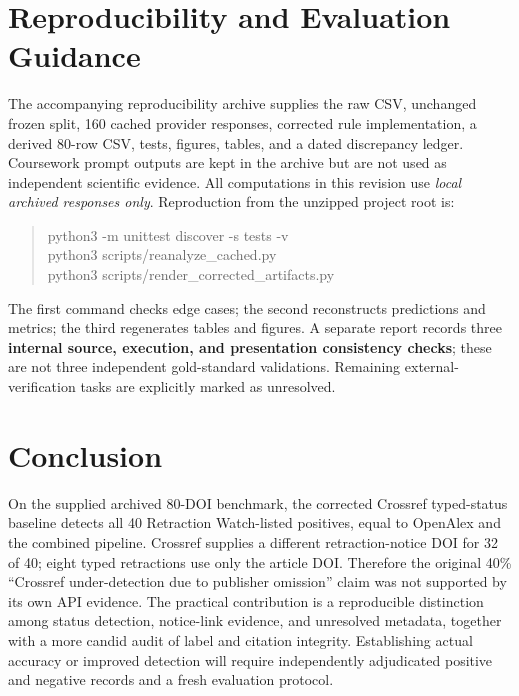 \documentclass[10pt,a4paper,twocolumn]{article}
\begin{document}
\section{Reproducibility and Evaluation Guidance}
The accompanying reproducibility archive supplies the raw CSV, unchanged frozen split, 160 cached provider responses, corrected rule implementation, a derived 80-row CSV, tests, figures, tables, and a dated discrepancy ledger. Coursework prompt outputs are kept in the archive but are not used as independent scientific evidence. All computations in this revision use \emph{local archived responses only}. Reproduction from the unzipped project root is:
\begin{quote}\footnotesize\ttfamily
python3 -m unittest discover -s tests -v\\
python3 scripts/reanalyze\_cached.py\\
python3 scripts/render\_corrected\_artifacts.py
\end{quote}
The first command checks edge cases; the second reconstructs predictions and metrics; the third regenerates tables and figures. A separate report records three \textbf{internal source, execution, and presentation consistency checks}; these are not three independent gold-standard validations. Remaining external-verification tasks are explicitly marked as unresolved.

\section{Conclusion}
On the supplied archived 80-DOI benchmark, the corrected Crossref typed-status baseline detects all 40 Retraction Watch-listed positives, equal to OpenAlex and the combined pipeline. Crossref supplies a different retraction-notice DOI for 32 of 40; eight typed retractions use only the article DOI. Therefore the original 40\% ``Crossref under-detection due to publisher omission'' claim was not supported by its own API evidence. The practical contribution is a reproducible distinction among status detection, notice-link evidence, and unresolved metadata, together with a more candid audit of label and citation integrity. Establishing actual accuracy or improved detection will require independently adjudicated positive and negative records and a fresh evaluation protocol.
\end{document}
